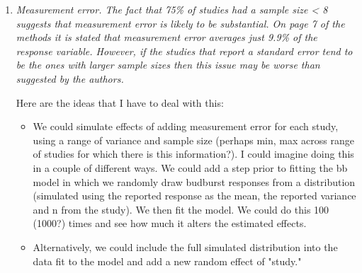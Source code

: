 \documentclass[11pt, a4paper]{article}
\begin{document}
\begin{enumerate}
\item \emph{Measurement error. The fact that 75\% of studies had a sample size < 8 suggests that
measurement error is likely to be substantial. On page 7 of the methods it is stated that
measurement error averages just 9.9\% of the response variable. However, if the studies that
report a standard error tend to be the ones with larger sample sizes then this issue may be
worse than suggested by the authors.}
\par Here are the ideas that I have to deal with this:
\begin{itemize}
\item  We could simulate effects of adding measurement error for each study, using a range of variance and sample size (perhaps min, max across range of studies for which there is this information?). I could imagine doing this in a couple of different ways. We could add a step prior to fitting the bb model in which we randomly draw budburst responses from a distribution (simulated using the reported response as the mean, the reported variance and n from the study). We then fit the model. We could do this 100 (1000?) times and see how much it alters the estimated effects. 
\item Alternatively, we could include the full simulated distribution into the data fit to the model and add a new random effect of "study."  


\end{itemize}
\end{enumerate}
\end{document}
